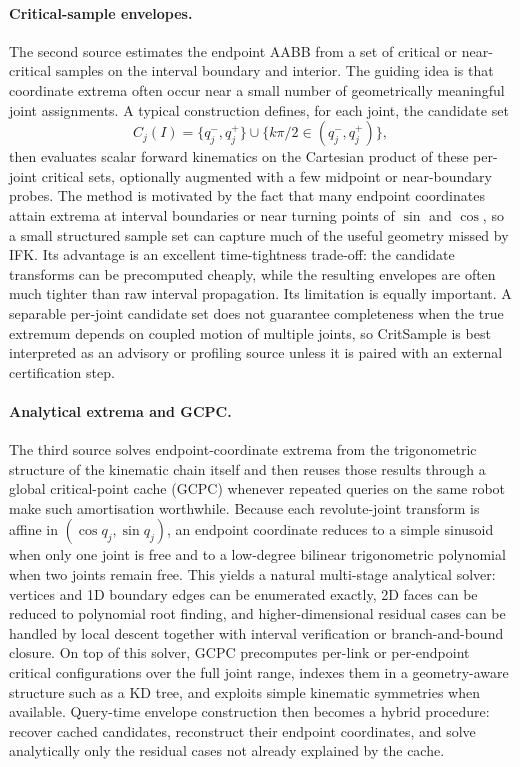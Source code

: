 \documentclass[journal]{IEEEtran}
\begin{document}
\paragraph{Critical-sample envelopes.}
The second source estimates the endpoint AABB from a set of critical or
near-critical samples on the interval boundary and interior. The guiding idea is
that coordinate extrema often occur near a small number of geometrically
meaningful joint assignments. A typical construction defines, for each joint,
the candidate set
\[
C_j(I) = \{q_j^-, q_j^+\} \cup \{k\pi/2 \in (q_j^-, q_j^+)\},
\]
then evaluates scalar forward kinematics on the Cartesian product of these
per-joint critical sets, optionally augmented with a few midpoint or
near-boundary probes. The method is motivated by the fact that many endpoint
coordinates attain extrema at interval boundaries or near turning points of
$\sin$ and $\cos$, so a small structured sample set can capture much of the
useful geometry missed by IFK. Its advantage is an excellent time-tightness
trade-off: the candidate transforms can be precomputed cheaply, while the
resulting envelopes are often much tighter than raw interval propagation. Its
limitation is equally important. A separable per-joint candidate set does not
guarantee completeness when the true extremum depends on coupled motion of
multiple joints, so CritSample is best interpreted as an advisory or profiling
source unless it is paired with an external certification step.

\paragraph{Analytical extrema and GCPC.}
The third source solves endpoint-coordinate extrema from the trigonometric
structure of the kinematic chain itself and then reuses those results through a
global critical-point cache (GCPC) whenever repeated queries on the same robot
make such amortisation worthwhile. Because each revolute-joint transform is
affine in $(\cos q_j,\sin q_j)$, an endpoint coordinate reduces to a simple
sinusoid when only one joint is free and to a low-degree bilinear
trigonometric polynomial when two joints remain free. This yields a natural
multi-stage analytical solver: vertices and 1D boundary edges can be enumerated
exactly, 2D faces can be reduced to polynomial root finding, and
higher-dimensional residual cases can be handled by local descent together with
interval verification or branch-and-bound closure. On top of this solver, GCPC
precomputes per-link or per-endpoint critical configurations over the full
joint range, indexes them in a geometry-aware structure such as a KD tree, and
exploits simple kinematic symmetries when available. Query-time envelope
construction then becomes a hybrid procedure: recover cached candidates,
reconstruct their endpoint coordinates, and solve analytically only the
residual cases not already explained by the cache.
\end{document}
